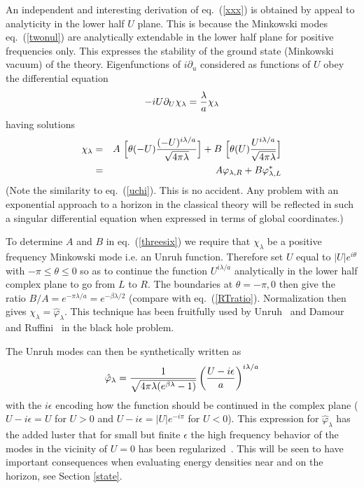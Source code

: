 \documentclass[12pt,oneside]{report}
\def\la{\lambda}
\begin{document}
An independent and interesting derivation of eq.~(\ref{xxx}) is obtained by
appeal to analyticity in the lower half $U$ plane. This is because the Minkowski
modes eq.~(\ref{twonul}) are analytically extendable in the lower half plane 
for positive frequencies only. This 
expresses the stability of the ground state (Minkowski vacuum) of the theory. 
Eigenfunctions of $i\partial_u$ considered as functions of $U$ obey the
differential equation \begin{equation}
-i U \partial_U \chi_\la =  {\la \over a} \chi_\la
\label{threefive}
\end{equation}
having solutions
\begin{eqnarray}
\chi_\la &=& 
A \ \Bigl[ \theta(-U) {(-U)^{i \la /a} \over \sqrt{4 \pi \la}} 
\Bigr]
+ B \ \Bigl[ \theta(U) { U^{i \la /a} \over \sqrt{4 \pi \la}} \Bigr]
\nonumber\\ 
&=& A \varphi_{\la,R} + B \varphi_{\la,L}^*
\label{threesix} \end{eqnarray}
(Note the similarity to eq.~(\ref{uchi}). This is no accident. Any problem with
an exponential approach to a horizon in the classical theory will be reflected
in such a singular differential equation when expressed in terms of global
coordinates.)

To determine $A$ and $B$ in eq.~(\ref{threesix}) we require that $\chi_\la$ be
a positive frequency Minkowski mode i.e. an Unruh function. Therefore set $U$
equal to $\vert U \vert e^{i \theta}$ with $- \pi \leq \theta \leq 0$ so as to
continue the function $U^{i \la/a}$ analytically in the lower half complex
plane to go from $L$ to $R$. The boundaries at $\theta= - \pi , 0$ then give the
ratio $ B  /  A  = e^{- \pi \la /a} = e^{- \beta \la /2}$
(compare with eq.~(\ref{RTratio}).
Normalization then gives $\chi_\la = \hat \varphi_\la$. This technique has
been fruitfully used by Unruh~\cite{Unru1} and Damour and Ruffini~\cite{DaRu}
in the black hole problem.

The Unruh modes can then be synthetically written as
\begin{equation}
\hat \varphi_\lambda = {1 \over \sqrt{4 \pi \lambda (e^{\beta \lambda}-1)}}
\left( { U - i \epsilon  \over a} \right ) ^{i \lambda / a}
\label{Unm}
\end{equation}
with  the $i \epsilon$ encoding how the function should be continued in the
complex plane ($  U - i \epsilon  = U$ for $U>0$ and
$ U - i \epsilon  = \vert U \vert e^{-i\pi}$ for $U<0$). This expression for
$\hat \varphi_\lambda$ has the added luster that for small but finite
$\epsilon$ the high frequency behavior of the modes in the vicinity of $U=0$
has been regularized~\cite{Pare}. This will be seen to have important
consequences  when evaluating energy densities near and on the horizon, see
 Section \ref{state}. 
\end{document}
